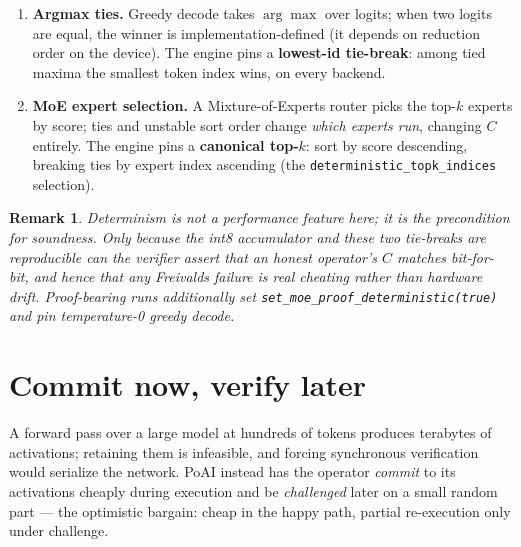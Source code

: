 \documentclass[11pt]{article}
\newtheorem{remark}{Remark}
\newcommand{\code}[1]{\texttt{#1}}
\begin{document}
\begin{enumerate}[leftmargin=1.6em]
  \item \textbf{Argmax ties.} Greedy decode takes $\arg\max$ over logits; when
        two logits are equal, the winner is implementation-defined (it depends on
        reduction order on the device). The engine pins a \textbf{lowest-id
        tie-break}: among tied maxima the smallest token index wins, on every
        backend.
  \item \textbf{MoE expert selection.} A Mixture-of-Experts router picks the
        top-$k$ experts by score; ties and unstable sort order change \emph{which
        experts run}, changing $C$ entirely. The engine pins a \textbf{canonical
        top-$k$}: sort by score descending, breaking ties by expert index
        ascending (the \code{deterministic\_topk\_indices} selection).
\end{enumerate}

\begin{remark}
Determinism is not a performance feature here; it is the precondition for
soundness. Only because the int8 accumulator and these two tie-breaks are
reproducible can the verifier assert that an honest operator's $C$ matches
bit-for-bit, and hence that \emph{any} Freivalds failure is real cheating rather
than hardware drift. Proof-bearing runs additionally set
\code{set\_moe\_proof\_deterministic(true)} and pin temperature-0 greedy decode.
\end{remark}

\section{Commit now, verify later}
\label{sec:mmr}

A forward pass over a large model at hundreds of tokens produces terabytes of
activations; retaining them is infeasible, and forcing synchronous verification
would serialize the network. PoAI instead has the operator \emph{commit} to its
activations cheaply during execution and be \emph{challenged} later on a small
random part --- the optimistic bargain: cheap in the happy path, partial
re-execution only under challenge.
\end{document}
